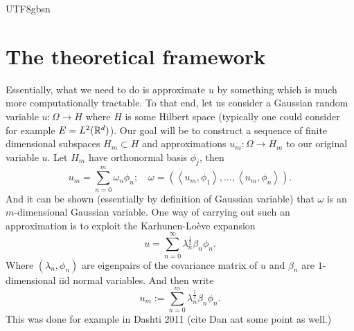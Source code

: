 \documentclass[12pt]{article}
\newcommand{\br}[1]{\left\langle#1\right\rangle}
\begin{document}
\begin{CJK*}{UTF8}{gbsn}
	\section{The theoretical framework}
	Essentially, what we need to do is approximate $u$ by something which is much more computationally tractable. To that end, let us consider a Gaussian random variable $u:\Omega\to H$ where $H$ is some Hilbert space (typically one could consider for example $E=L^2({\mathbb R}^d)$). Our goal will be to construct a sequence of finite dimensional subspaces $H_m\subset H$ and approximations $u_m:\Omega\to H_m$ to our original variable $u$. Let $H_m$ have orthonormal basis $\phi_j$, then
	\begin{equation*}
		u_m=\sum_{n=0}^{m} \omega_n\phi_n;\quad \omega=(\br{u_m,\phi_1},\ldots,\br{u_m,\phi_n}).
	\end{equation*}
	And it can be shown (essentially by definition of Gaussian variable) that $\omega$ is an $m$-dimensional Gaussian variable. One way of carrying out such an approximation is to exploit the Karhunen-Loève expansion
	\begin{equation*}
		u=\sum_{n=0}^{\infty} \lambda _n^\frac{1}{2}\beta _n\phi_n.
	\end{equation*}
	Where $(\lambda _n,\phi_n)$ are eigenpairs of the covariance matrix of $u$ and $\beta _n$ are $1$-dimensional iid normal variables. And then write
	\begin{equation*}
		u_m:=\sum_{n=0}^{m}\lambda _n^\frac{1}{2}\beta _n\phi_n.
	\end{equation*}
	This was done for example in Dashti 2011 (cite Dan aat some point as well.)
\end{CJK*}




\end{document}
